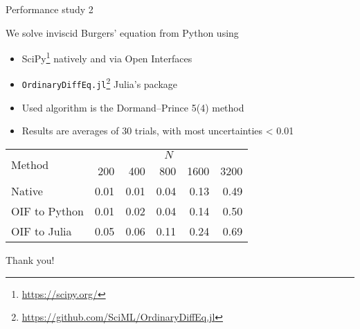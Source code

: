 \documentclass[10pt, aspectratio=169, progressbar=frametitle]{beamer}
\begin{document}
\begin{frame}{Performance study 2}

  We solve inviscid Burgers' equation from Python using
  \begin{itemize}
  \item SciPy\footnote{\url{https://scipy.org/}}
  natively and via Open Interfaces
    \item \texttt{OrdinaryDiffEq.jl}\footnote{%
          \url{https://github.com/SciML/OrdinaryDiffEq.jl}} Julia's package
  \item Used algorithm is the Dormand--Prince 5(4) method
  \item Results are averages of 30 trials, with most uncertainties < 0.01
  \end{itemize}

  \begin{table}[htbp]
    \centering
    \begin{tabular}{@{}lrrrrr@{}}
      \toprule
      \multirow{2}{*}{\centering Method} & \multicolumn{5}{c}{$N$} \\
\cmidrule(l){2-6}
& 200 & 400 & 800 & 1600 & 3200 \\
    \midrule
    Native & 0.01 & 0.01 & 0.04 & 0.13 & 0.49 \\
    OIF to Python & 0.01 & 0.02 & 0.04 & 0.14 & 0.50 \\
    OIF to Julia & 0.05 & 0.06 & 0.11 & 0.24 & 0.69 \\
    \bottomrule
    \end{tabular}
  \end{table}
\end{frame}

% 

\begin{frame}[standout]{}
  \centering
  \huge{Thank you!}
\end{frame}
\end{document}
